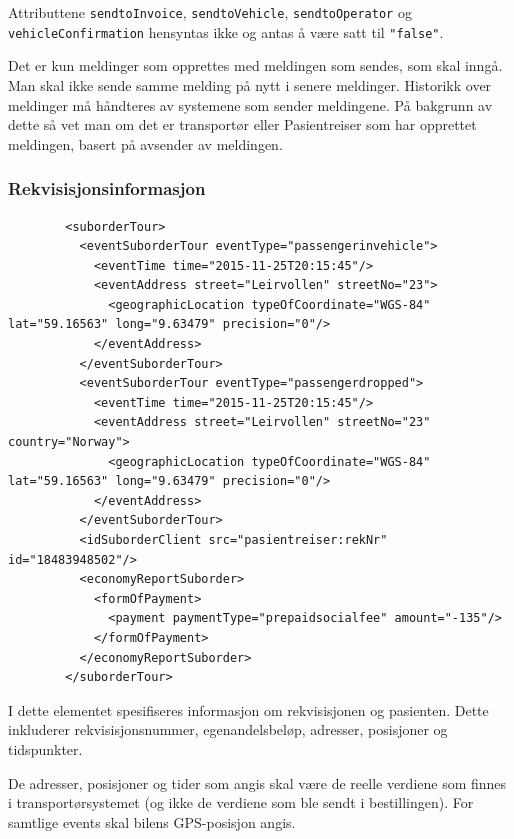 \documentclass[a4paper,titlepage,norsk,11pt]{article}
\begin{document}
\begin{description}
  Attributtene \lstinline{sendtoInvoice}, \lstinline{sendtoVehicle}, \lstinline{sendtoOperator} og  \lstinline{vehicleConfirmation} hensyntas ikke og antas å være satt til \lstinline{"false"}.

  Det er kun meldinger som opprettes med meldingen som sendes, som skal inngå. Man skal ikke sende samme melding på nytt i senere meldinger. Historikk over meldinger må håndteres av systemene som sender meldingene. På bakgrunn av dette så vet man om det er transportør eller Pasientreiser som har opprettet meldingen, basert på avsender av meldingen.

\end{description}

\subsubsection{Rekvisisjonsinformasjon}

\begin{lstlisting}
        <suborderTour>
          <eventSuborderTour eventType="passengerinvehicle">
            <eventTime time="2015-11-25T20:15:45"/>
            <eventAddress street="Leirvollen" streetNo="23">
              <geographicLocation typeOfCoordinate="WGS-84" lat="59.16563" long="9.63479" precision="0"/>
            </eventAddress>
          </eventSuborderTour>
          <eventSuborderTour eventType="passengerdropped">
            <eventTime time="2015-11-25T20:15:45"/>
            <eventAddress street="Leirvollen" streetNo="23" country="Norway">
              <geographicLocation typeOfCoordinate="WGS-84" lat="59.16563" long="9.63479" precision="0"/>
            </eventAddress>
          </eventSuborderTour>
          <idSuborderClient src="pasientreiser:rekNr" id="18483948502"/>
          <economyReportSuborder>
            <formOfPayment>
              <payment paymentType="prepaidsocialfee" amount="-135"/>
            </formOfPayment>
          </economyReportSuborder>
        </suborderTour>
\end{lstlisting}

I dette elementet spesifiseres informasjon om rekvisisjonen og pasienten. Dette inkluderer rekvisisjonsnummer, egenandelsbeløp, adresser, posisjoner og tidspunkter.

De adresser, posisjoner og tider som angis skal være de reelle verdiene som finnes i transportørsystemet (og ikke de verdiene som ble sendt i bestillingen). For samtlige events skal bilens GPS-posisjon angis.
\end{document}
